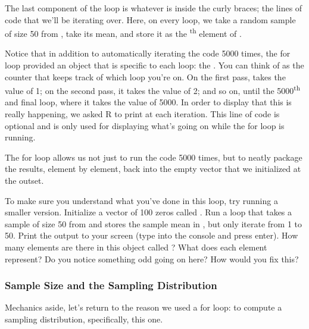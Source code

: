 \documentclass[11pt]{article}
\begin{document}
The last component of the loop is whatever is inside the curly braces; the lines of code that we'll be iterating over.  Here, on every loop, we take a random sample of size 50 from \texttt{}, take its mean, and store it as the \texttt{}\textsuperscript{th} element of \texttt{}.

Notice that in addition to automatically iterating the code 5000 times, the for loop provided an object that is specific to each loop: the \texttt{}.  You can think of \texttt{} as the counter that keeps track of which loop you're on.  On the first pass, \texttt{} takes the value of 1; on the second pass, it takes the value of 2; and so on, until the 5000\textsuperscript{th} and final loop, where it takes the value of 5000. In order to display that this is really happening, we asked R to print \texttt{} at each iteration. This line of code is optional and is only used for displaying what's going on while the for loop is running.

The for loop allows us not just to run the code 5000 times, but to neatly package the results, element by element, back into the empty vector that we initialized at the outset. 

\begin{exercise}
To make sure you understand what you've done in this loop, try running a smaller version.  Initialize a vector of 100 zeros called \texttt{}.  Run a loop that takes a sample of size 50 from \texttt{} and stores the sample mean in \texttt{}, but only iterate from 1 to 50.  Print the output to your screen (type \texttt{} into the console and press enter).  How many elements are there in this object called \texttt{}? What does each element represent? Do you notice something odd going on here? How would you fix this?
\end{exercise}

\subsubsection*{Sample Size and the Sampling Distribution}
Mechanics aside, let's return to the reason we used a for loop: to compute a sampling distribution, specifically, this one.

\ttfamily\noindent
\hlstd{}\hspace*{\fill}\\
\hlstd{}\hlkeyword{(}\hlkeyword{)}\hspace*{\fill}\\
\normalfont
\end{document}
